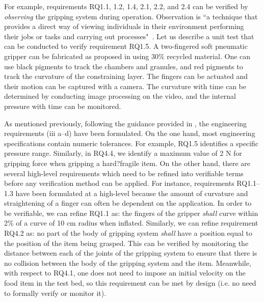 \documentclass[letterpaper, 10 pt, conference]{ieeeconf}  %
\begin{document}
	For example, requirements RQ1.1, 1.2, 1.4, 2.1, 2.2, and 2.4 can be verified by \emph{observing} the gripping system during operation. 
	Observation is ``a technique that provides a direct way of viewing individuals in their environment performing their jobs or tasks and carrying out processes"~\cite{ISO24765:2017}.
	Let us describe a unit test that can be conducted to verify requirement RQ1.5. 
	A two-fingered soft pneumatic gripper can be fabricated as proposed in \cite{Partridge2022} using 30\% recycled material. 
	One can use black pigments to track the chambers and granules, and red pigments to track the curvature of the constraining layer. 
	The fingers can be actuated and their motion can be captured with a camera. 
	The curvature with time can be determined by conducting image processing on the video, and the internal pressure with time can be monitored.
	
	As mentioned previously, following the guidance provided in \cite{NASA2007}, the engineering requirements (iii a--d) have been formulated. 
	On the one hand, most engineering specifications contain numeric tolerances. 
	For example, RQ1.5 identifies a specific pressure range. 
	Similarly, in RQ4.4, we identify a maximum value of 2 N for gripping force when gripping a hard?fragile item. 
	On the other hand, there are several high-level requirements which need to be refined into verifiable terms before any verification method can be applied.  
	For instance, requirements RQ1.1--1.3 have been formulated at a high-level because the amount of curvature and straightening of a finger can often be dependent on the application. 
	In order to be verifiable, we can refine RQ1.1 as: the fingers of the gripper \emph{shall} curve within 2\% of a curve of 10 cm radius when inflated. 
	Similarly, we can refine requirement RQ4.2 as: no part of the body of gripping system \emph{shall} have a position equal to the position of the item being grasped. 
	This can be verified by monitoring the distance between each of the joints of the gripping system to ensure that there is no collision between the body of the gripping system and the item. 
	Meanwhile, with respect to RQ4.1, one does not need to impose an initial velocity on the food item in the test bed, so this requirement can be met by design (i.e. no need to formally verify or monitor it).
	
\end{document}
